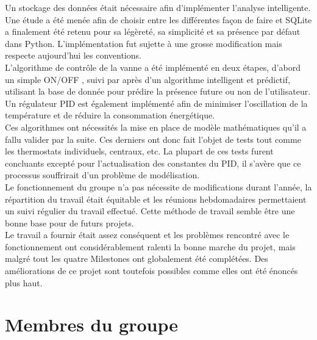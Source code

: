 \documentclass[11pt,a4paper,11pt]{report}
\begin{document}
Un stockage des données était nécessaire afin d'implémenter l'analyse intelligente. Une étude a été menée afin de choisir entre les différentes façon de faire et SQLite a finalement été retenu pour sa légèreté, sa simplicité et sa présence par défaut dans Python. L'implémentation fut sujette à une grosse modification mais respecte aujourd'hui les conventions.\\

L'algorithme de contrôle de la vanne a été implémenté en deux étapes, d'abord un simple \og ON/OFF \fg, suivi par après d'un algorithme intelligent et prédictif, utilisant la base de donnée pour prédire la présence future ou non de l'utilisateur. Un régulateur PID est également implémenté afin de minimiser l'oscillation de la température et de réduire la consommation énergétique.\\

Ces algorithmes ont nécessités la mise en place de modèle mathématiques qu'il a fallu valider par la suite. Ces derniers ont donc fait l'objet de tests tout comme les thermostats individuels, centraux, etc. La plupart de ces tests furent concluants excepté pour l'actualisation des constantes du PID, il s'avère que ce processus souffrirait d'un problème de modélisation.\\

Le fonctionnement du groupe n'a pas nécessite de modifications durant l'année, la répartition du travail était équitable et les réunions hebdomadaires permettaient un suivi régulier du travail effectué. Cette méthode de travail semble être une bonne base pour de futurs projets.\\

Le travail a fournir était assez conséquent et les problèmes rencontré avec le fonctionnement ont considérablement ralenti la bonne marche du projet, mais malgré tout les quatre Milestones ont globalement été complétées. Des améliorations de ce projet sont toutefois possibles comme elles ont été énoncés plus haut.


\newpage


\chapter{Membres du groupe}
\end{document}
